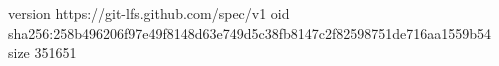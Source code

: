version https://git-lfs.github.com/spec/v1
oid sha256:258b496206f97e49f8148d63e749d5c38fb8147c2f82598751de716aa1559b54
size 351651
